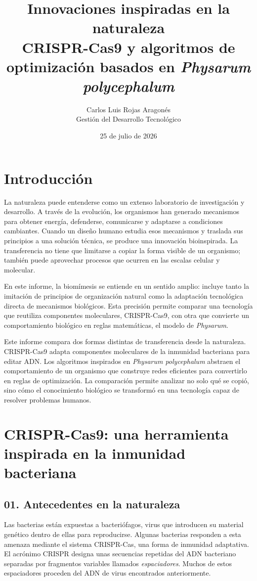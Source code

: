\documentclass[11pt,letterpaper]{article}
\title{\textbf{Innovaciones inspiradas en la naturaleza}\\
\large CRISPR-Cas9 y algoritmos de optimización basados en
\emph{Physarum polycephalum}}
\author{Carlos Luis Rojas Aragonés\\
Gestión del Desarrollo Tecnológico}
\date{25 de julio de 2026}
\begin{document}
\maketitle

\section{Introducción}

La naturaleza puede entenderse como un extenso laboratorio de investigación y
desarrollo. A través de la evolución, los organismos han generado mecanismos
para obtener energía, defenderse, comunicarse y adaptarse a condiciones
cambiantes. Cuando un diseño humano estudia esos mecanismos y traslada sus
principios a una solución técnica, se produce una innovación bioinspirada. La
transferencia no tiene que limitarse a copiar la forma visible de un organismo;
también puede aprovechar procesos que ocurren en las escalas celular y
molecular.

En este informe, la biomímesis se entiende en un sentido amplio: incluye tanto
la imitación de principios de organización natural como la adaptación
tecnológica directa de mecanismos biológicos. Esta precisión permite comparar
una tecnología que reutiliza componentes moleculares, CRISPR-Cas9, con otra que
convierte un comportamiento biológico en reglas matemáticas, el modelo de
\emph{Physarum}.

Este informe compara dos formas distintas de transferencia desde la naturaleza.
CRISPR-Cas9 adapta componentes moleculares de la inmunidad bacteriana para
editar ADN. Los algoritmos inspirados en \emph{Physarum polycephalum} abstraen
el comportamiento de un organismo que construye redes eficientes para
convertirlo en reglas de optimización. La comparación permite analizar no solo
qué se copió, sino cómo el conocimiento biológico se transformó en una
tecnología capaz de resolver problemas humanos.

\section{CRISPR-Cas9: una herramienta inspirada en la inmunidad bacteriana}

\subsection*{01. Antecedentes en la naturaleza}

Las bacterias están expuestas a bacteriófagos, virus que introducen su material
genético dentro de ellas para reproducirse. Algunas bacterias responden a esta
amenaza mediante el sistema CRISPR-Cas, una forma de inmunidad adaptativa. El
acrónimo CRISPR designa unas secuencias repetidas del ADN bacteriano separadas
por fragmentos variables llamados \emph{espaciadores}. Muchos de estos
espaciadores proceden del ADN de virus encontrados anteriormente.
\end{document}
